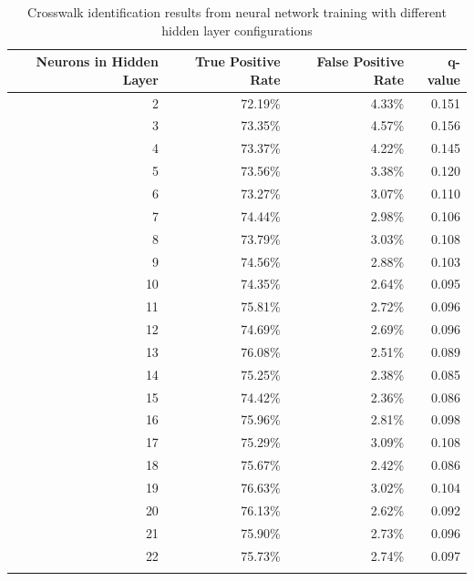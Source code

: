 \documentclass[12pt]{ucthesis}
\begin{document}

\begin{center}
    \begin{longtable}{| r | r | r | r |}
    \hline
    Neurons in Hidden Layer & True Positive Rate & False Positive Rate & q-value \bigstrut\\
    \hline
    2  & 72.19\% & 4.33\% & 0.151 \bigstrut\\
    \hline
    3  & 73.35\% & 4.57\% & 0.156 \bigstrut\\
    \hline
    4  & 73.37\% & 4.22\% & 0.145 \bigstrut\\
    \hline
    5  & 73.56\% & 3.38\% & 0.120 \bigstrut\\
    \hline
    6  & 73.27\% & 3.07\% & 0.110 \bigstrut\\
    \hline
    7  & 74.44\% & 2.98\% & 0.106 \bigstrut\\
    \hline
    8  & 73.79\% & 3.03\% & 0.108 \bigstrut\\
    \hline
    9  & 74.56\% & 2.88\% & 0.103 \bigstrut\\
    \hline
    10 & 74.35\% & 2.64\% & 0.095 \bigstrut\\
    \hline
    11 & 75.81\% & 2.72\% & 0.096 \bigstrut\\
    \hline
    12 & 74.69\% & 2.69\% & 0.096 \bigstrut\\
    \hline
    13 & 76.08\% & 2.51\% & 0.089 \bigstrut\\
    \hline
    14 & 75.25\% & 2.38\% & 0.085 \bigstrut\\
    \hline
    15 & 74.42\% & 2.36\% & 0.086 \bigstrut\\
    \hline
    16 & 75.96\% & 2.81\% & 0.098 \bigstrut\\
    \hline
    17 & 75.29\% & 3.09\% & 0.108 \bigstrut\\
    \hline
    18 & 75.67\% & 2.42\% & 0.086 \bigstrut\\
    \hline
    19 & 76.63\% & 3.02\% & 0.104 \bigstrut\\
    \hline
    20 & 76.13\% & 2.62\% & 0.092 \bigstrut\\
    \hline
    21 & 75.90\% & 2.73\% & 0.096 \bigstrut\\
    \hline
    22 & 75.73\% & 2.74\% & 0.097 \bigstrut\\
    \hline

    \hline
    \caption{Crosswalk identification results from neural network training with different hidden layer configurations}
    \label{tab:NN-HiddenLayersResults} 
    \end{longtable}
\end{center}
\end{document}
